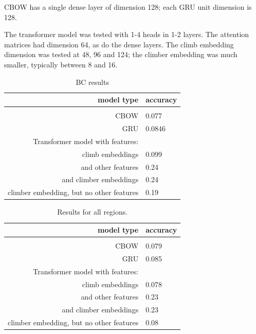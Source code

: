 \documentclass[10pt]{article}
\begin{document}
CBOW has a single dense layer of dimension 128; each GRU unit dimension is 128.

The transformer model was tested with 1-4 heads in 1-2 layers. The attention matrices had dimension 64, as do the dense layers. The climb embedding dimension was tested at 48, 96 and 124; the climber embedding was much smaller, typically between 8 and 16.




\begin{table}[h]
  \centering
  \begin{tabular}{r | l}
    \textbf{model type} & \textbf{accuracy} \\
    \hline \\
    CBOW & 0.077 \\
    GRU & 0.0846 \\
    Transformer model with features: & \\
    climb embeddings & 0.099 \\
    and other features & 0.24  \\
    and climber embeddings & 0.24 \\
    climber embedding, but no other features & 0.19
    
  \end{tabular}
  \caption{BC results}
  \label{tab:BC}
\end{table}

\begin{table}[h]
  \centering
  \begin{tabular}{r | l}
    \textbf{model type} & \textbf{accuracy} \\
    \hline \\
    CBOW & 0.079 \\
    GRU & 0.085 \\
    Transformer model with features: & \\
    climb embeddings & 0.078 \\
    and other features & 0.23  \\
    and climber embeddings & 0.23 \\
    climber embedding, but no other features & 0.08
    
  \end{tabular}
  \caption{Results for all regions.}
  \label{tab:all}
\end{table}
\end{document}
